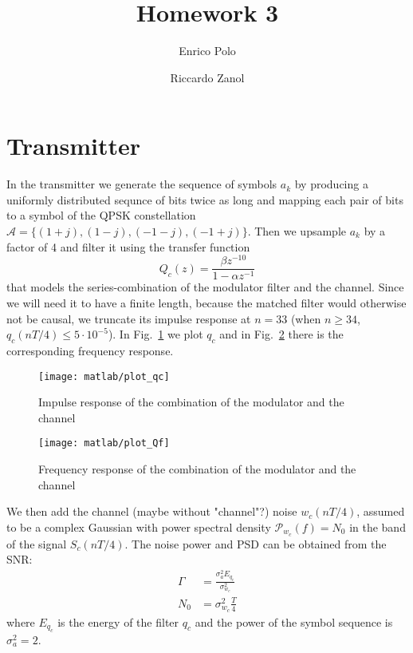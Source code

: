 \documentclass[a4paper,oneside]{article}
\author{Enrico Polo \and Riccardo Zanol}
\title{Homework 3}
\begin{document}
\maketitle
\section{Transmitter}
In the transmitter we generate the sequence of symbols $a_k$ by
producing a uniformly distributed sequnce of bits twice as long and
mapping each pair of bits to a symbol of the QPSK constellation $
\mathcal{A} = \{(1+j),(1-j),(-1-j),(-1+j)\}$. Then we upsample $a_k$
by a factor of 4 and filter it using the transfer function
\begin{equation}
  Q_c(z) = \frac{\beta z^{-10}}{1 - \alpha z^{-1}}
\end{equation}
that models the {\color{red} series-combination of the modulator filter and
  the channel}.  Since we will need it to have a finite length,
because the matched filter would otherwise not be causal, we truncate
its impulse response at $n=33$ (when $n \geq 34$, $q_c(nT/4) \leq
5\cdot10^{-5}$). In Fig.~\ref{plot:qc} we plot $q_c$ and in
Fig.~\ref{plot:Qf} there is the corresponding frequency response.
\begin{figure}[htbp]
  \centering
  \texttt{[image: matlab/plot\_qc]}
  \caption{Impulse response of the combination of the modulator and
    the channel}
  \label{plot:qc}
\end{figure}
\begin{figure}[htbp]
  \centering
  \texttt{[image: matlab/plot\_Qf]}
  \caption{Frequency response of the combination of the modulator and
    the channel}
  \label{plot:Qf}
\end{figure}

We then add {\color{red} the channel (maybe without "channel"?) noise} $w_c(nT/4)$, assumed to be
a complex Gaussian with power spectral density $\mathcal{P}_{w_c}(f) =
N_0$ in the band of the signal $S_c(nT/4)$. The noise power and PSD
can be obtained from the SNR:
\begin{align}
  \Gamma &= \frac{\sigma^2_a E_{q_c}}{\sigma^2_{w_c}} \\
  N_0 &= \sigma^2_{w_c}\frac{T}{4}
\end{align}
where $E_{q_c}$ is the energy of the filter $q_c$ and the power of the
symbol sequence is $\sigma^2_a = 2$.
\end{document}
